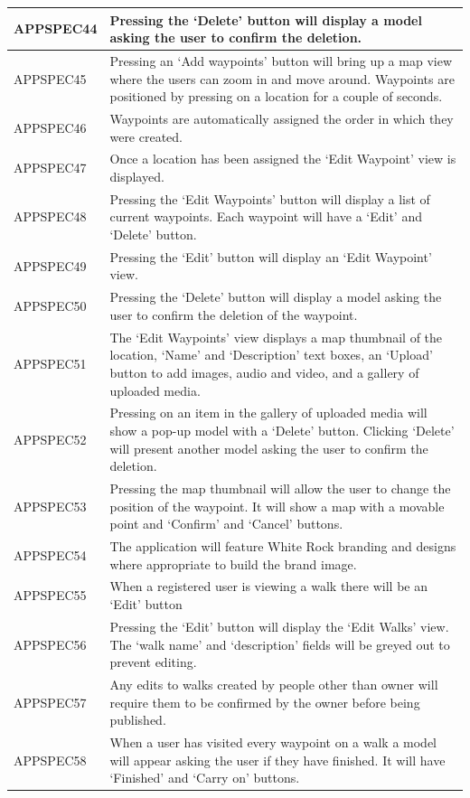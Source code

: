 \documentclass[11pt,a4paper]{article}
\begin{document}
\begin{longtable}{|p{2.5cm}p{13cm}|}
APPSPEC44 & Pressing the `Delete' button will display a model asking the user to confirm the deletion. \\ \hline
APPSPEC45 & Pressing an `Add waypoints' button will bring up a map view where the users can zoom in and move around. Waypoints are positioned by pressing on a location for a couple of seconds. \\ \hline
APPSPEC46 & Waypoints are automatically assigned the order in which they were created. \\ \hline
APPSPEC47 & Once a location has been assigned the `Edit Waypoint' view is displayed.\\ \hline
APPSPEC48 & Pressing the `Edit Waypoints' button will display a list of current waypoints. Each waypoint will have a `Edit' and `Delete' button. \\ \hline
APPSPEC49 & Pressing the `Edit' button will display an `Edit Waypoint' view. \\ \hline
APPSPEC50 & Pressing the `Delete' button will display a model asking the user to confirm the deletion of the waypoint. \\ \hline
APPSPEC51 & The `Edit Waypoints' view displays a map thumbnail of the location, `Name' and `Description' text boxes, an `Upload' button to add images, audio and video, and a gallery of uploaded media. \\ \hline
APPSPEC52 & Pressing on an item in the gallery of uploaded media will show a pop-up model with a `Delete' button. Clicking `Delete' will present another model asking the user to confirm the deletion. \\ \hline
APPSPEC53 & Pressing the map thumbnail will allow the user to change the position of the waypoint. It will show a map with a movable point and `Confirm' and `Cancel' buttons. \\ \hline
APPSPEC54 & The application will feature White Rock branding and designs where appropriate to build the brand image. \\ \hline
APPSPEC55 & When a registered user is viewing a walk there will be an `Edit' button \\ \hline
APPSPEC56 & Pressing the `Edit' button will display the `Edit Walks' view. The `walk name' and `description' fields will be greyed out to prevent editing.\\ \hline
APPSPEC57 & Any edits to walks created by people other than owner will require them to be confirmed by the owner before being published. \\ \hline
APPSPEC58 & When a user has visited every waypoint on a walk a model will appear asking the user if they have finished. It will have `Finished' and `Carry on' buttons. \\ \hline

\end{longtable}
\end{document}
